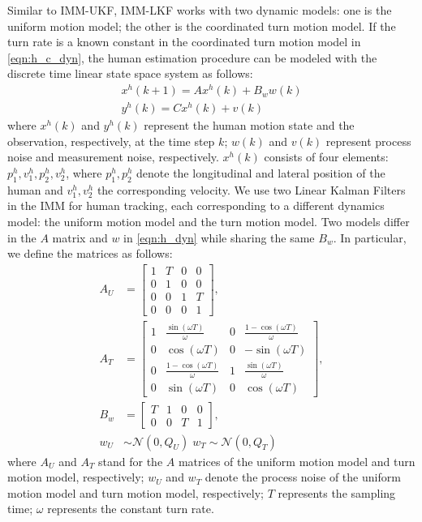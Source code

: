 \documentclass[letterpaper, 10 pt, conference]{ieeeconf}
\begin{document}
Similar to IMM-UKF, IMM-LKF works with two dynamic models: one is the uniform motion model; the other is the coordinated turn motion model. If the turn rate is a known constant in the coordinated turn motion model in \cref{eqn:h_c_dyn}, the human estimation procedure can be modeled with the discrete time linear state space system as follows:
\begin{subequations}
\begin{align}
x^h(k+1) = Ax^h(k)+B_ww(k)\label{eqn:h_dyn}\\
y^h(k)=Cx^h(k)+v(k)\label{eqn:observation}
\end{align}
\end{subequations}
where $x^h(k)$ and $y^h(k)$ represent the human motion state and the observation, respectively, at the time step $k$; $w(k)$ and $v(k)$ represent process noise and measurement noise, respectively.
$x^h(k)$ consists of four elements: $p^h_1,v^h_1,p^h_2,v^h_2$, where $p^h_1,p^h_2$ denote the longitudinal and lateral position of the human and $v^h_1,v^h_2$ the corresponding velocity.
We use two Linear Kalman Filters in the IMM for human tracking, each corresponding to a different dynamics model: the uniform motion model and the turn motion model.
Two models differ in the $A$ matrix and $w$ in \cref{eqn:h_dyn} while sharing the same $B_w$.
In particular, we define the matrices as follows:
\begin{subequations}
\begin{align}
A_U&=\left[
\begin{array}{cccc}
1& T& 0& 0\\
0& 1& 0& 0\\
0& 0& 1& T\\
0& 0& 0& 1
\end{array}\right],\label{eqn:A_U}\\
A_T&=\left[
\begin{array}{cccc}
1& \frac{\sin(\omega T)}{\omega}& 0& \frac{1-\cos(\omega T)}{\omega}\\
0& \cos(\omega T)& 0& -\sin(\omega T)\\
0& \frac{1-\cos(\omega T)}{\omega}& 1& \frac{\sin(\omega T)}{\omega}\\
0& \sin(\omega T)& 0& \cos(\omega T)
\end{array}\right],\label{eqn:A_T}\\
B_w&=\left[
\begin{array}{cccc}
T& 1& 0& 0\\
0& 0& T& 1
\end{array}\right],\label{eqn:B_w}\\
w_U&\sim\mathcal{N}(0,Q_U)\; w_T\sim\mathcal{N}(0,Q_T)\label{eqn:pro_noise}
\end{align}
\end{subequations}
where $A_U$ and $A_T$ stand for the $A$ matrices of the uniform motion model and turn motion model, respectively; $w_U$ and $w_T$ denote the process noise of the uniform motion model and turn motion model, respectively; $T$ represents the sampling time; $\omega$ represents the constant turn rate.
\end{document}
